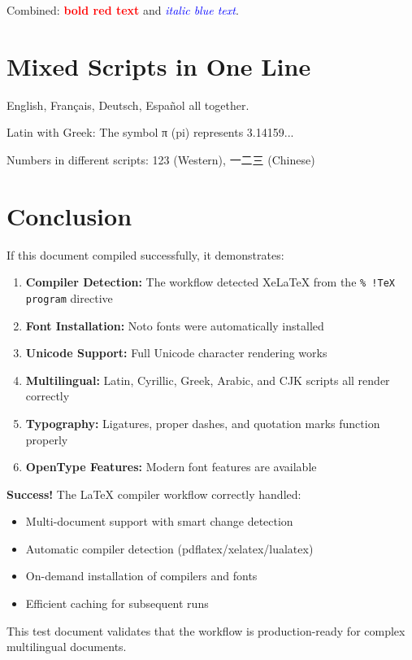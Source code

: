 \documentclass[12pt,a4paper]{article}
\newcommand{\textcjk}[1]{{\cjkfont #1}}
\begin{document}
Combined: \textcolor{red}{\textbf{bold red text}} and \textcolor{blue}{\textit{italic blue text}}.

\section{Mixed Scripts in One Line}

English, Français, Deutsch, Español all together.

Latin with Greek: The symbol π (pi) represents 3.14159...

Numbers in different scripts: 123 (Western), \textcjk{一二三} (Chinese)

\section{Conclusion}

If this document compiled successfully, it demonstrates:

\begin{enumerate}
    \item \textbf{Compiler Detection:} The workflow detected XeLaTeX from the \texttt{\% !TeX program} directive
    \item \textbf{Font Installation:} Noto fonts were automatically installed
    \item \textbf{Unicode Support:} Full Unicode character rendering works
    \item \textbf{Multilingual:} Latin, Cyrillic, Greek, Arabic, and CJK scripts all render correctly
    \item \textbf{Typography:} Ligatures, proper dashes, and quotation marks function properly
    \item \textbf{OpenType Features:} Modern font features are available
\end{enumerate}

\vspace{1em}

\textbf{Success!} The LaTeX compiler workflow correctly handled:
\begin{itemize}
    \item Multi-document support with smart change detection
    \item Automatic compiler detection (pdflatex/xelatex/lualatex)
    \item On-demand installation of compilers and fonts
    \item Efficient caching for subsequent runs
\end{itemize}

This test document validates that the workflow is production-ready for complex multilingual documents.
\end{document}
